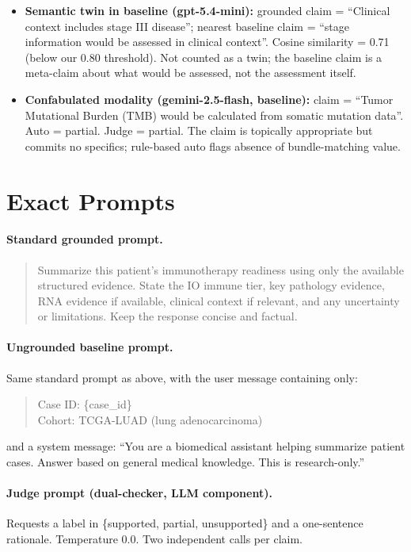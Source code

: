 \documentclass{article}
\theoremstyle{plain}
\begin{document}
\begin{itemize}
\item \textbf{Semantic twin in baseline (gpt-5.4-mini):} grounded claim = ``Clinical context includes stage III disease''; nearest baseline claim = ``stage information would be assessed in clinical context''. Cosine similarity = 0.71 (below our 0.80 threshold). Not counted as a twin; the baseline claim is a meta-claim about what would be assessed, not the assessment itself.

\item \textbf{Confabulated modality (gemini-2.5-flash, baseline):} claim = ``Tumor Mutational Burden (TMB) would be calculated from somatic mutation data''. Auto = partial. Judge = partial. The claim is topically appropriate but commits no specifics; rule-based auto flags absence of bundle-matching value.
\end{itemize}

\section{Exact Prompts}
\label{app:prompts}

\paragraph{Standard grounded prompt.}
\begin{quote}\small\ttfamily
Summarize this patient's immunotherapy readiness using only the available structured evidence. State the IO immune tier, key pathology evidence, RNA evidence if available, clinical context if relevant, and any uncertainty or limitations. Keep the response concise and factual.
\end{quote}

\paragraph{Ungrounded baseline prompt.}
Same standard prompt as above, with the user message containing only:
\begin{quote}\small\ttfamily
Case ID: \{case\_id\}\\
Cohort: TCGA-LUAD (lung adenocarcinoma)
\end{quote}
and a system message: ``You are a biomedical assistant helping summarize patient cases. Answer based on general medical knowledge. This is research-only.''

\paragraph{Judge prompt (dual-checker, LLM component).}
Requests a label in \{supported, partial, unsupported\} and a one-sentence rationale. Temperature 0.0. Two independent calls per claim.
\end{document}
